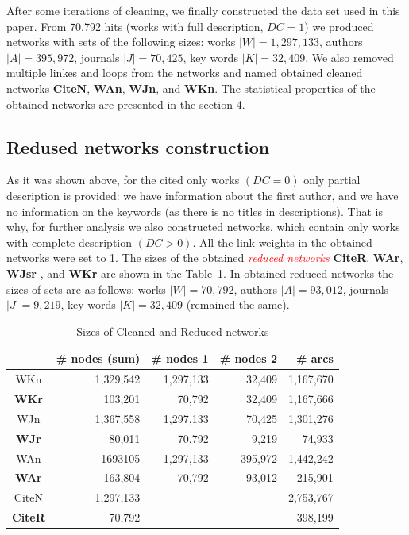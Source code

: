 \documentclass[11pt]{article} %
\newcommand{\keyw}[1]{\textcolor{red}{\emph{#1}}}
\newcommand{\Remark}[1]{\ifodd\value{page} \normalmarginpar
 \else \reversemarginpar \fi \marginpar{{\footnotesize #1}} }
\begin{document}
After some iterations of cleaning, we finally constructed the data set used in this paper. From 70,792 hits (works with full description, $DC=1$) we produced networks with sets of the following sizes: works $|W| = 1,297,133$, authors $|A| = 395,972$, journals $|J| = 70,425$, key words $|K| = 32,409$. We also removed multiple linkes and loops from the networks and named obtained cleaned networks \textbf{CiteN}, \textbf{WAn}, \textbf{WJn}, and \textbf{WKn}. The statistical properties of the obtained networks are presented in the section 4. \medskip  

\subsection{Redused networks construction}

As it was shown above, for the cited only  works  $(DC=0)$ only partial description is provided: we have information about the first author, and we have no information on the keywords (as there is no titles in descriptions). That is why, for further analysis we also constructed networks, which contain only works with complete description $(DC>0)$. All the link weights in the obtained networks were set to 1. The sizes of the obtained \keyw{reduced networks} \textbf{CiteR}, \textbf{WAr}, \textbf{WJsr}\Remark{names of nets}, and \textbf{WKr} are shown in the Table~\ref{rednet}. In obtained reduced networks  the sizes of sets are as follows: works $|W| = 70,792$, authors $|A| = 93,012$, journals $|J| = 9,219$, key words $|K| = 32,409$ (remained the same).\medskip 

\begin{table}
\caption{Sizes of Cleaned and Reduced networks}\label{rednet}\medskip
\begin{center}
\begin{tabular}{c|r|r|r|r}
	&\# nodes (sum)	& \# nodes 1	&\# nodes 2	& \# arcs \\ \hline		 
WKn &  	1,329,542	& 1,297,133	& 32,409	& 1,167,670 \\
\textbf{WKr}	& 103,201	& 70,792	& 32,409	& 1,167,666 \\ \hline	
WJn & 	1,367,558	& 1,297,133	& 70,425	& 1,301,276 \\ 
\textbf{WJr} 	& 80,011	& 70,792	& 9,219	& 74,933 \\ \hline	
WAn	& 1693105	& 1,297,133	& 395,972	& 1,442,242 \\ 
\textbf{WAr}	& 163,804	& 70,792	& 93,012	& 215,901 \\ \hline	
CiteN & 1,297,133 & & & 2,753,767\\ 
\textbf{CiteR} & 70,792 & & & 398,199 \\ \hline
\end{tabular}				
\end{center}
\end{table}
\end{document}
